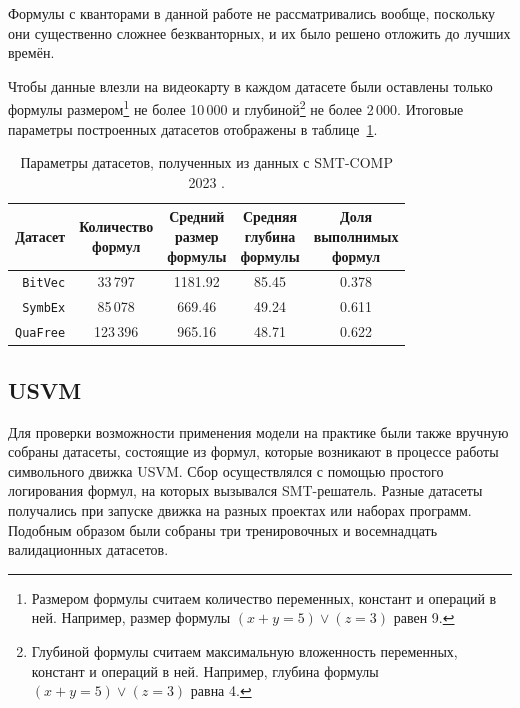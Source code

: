 Формулы с кванторами в данной работе не рассматривались вообще, поскольку они существенно сложнее безкванторных, и их было решено отложить до лучших времён.

Чтобы данные влезли на видеокарту в каждом датасете были оставлены только формулы размером\footnote{Размером формулы считаем количество переменных, констант и операций в ней. Например, размер формулы $(x + y = 5) \vee (z = 3)$ равен 9.} не более 10\,000 и глубиной\footnote{Глубиной формулы считаем максимальную вложенность переменных, констант и операций в ней. Например, глубина формулы $(x + y = 5) \vee (z = 3)$ равна 4.} не более 2\,000. Итоговые параметры построенных датасетов отображены в таблице~\ref{smt-comp-datasets-table}.

\begin{table}[ht]
\begin{center}
\begin{tabular}{r|cccc}
    Датасет & \makecell{Количество \\ формул} & \makecell{Средний \\ размер \\ формулы} & \makecell{Средняя \\ глубина \\ формулы} & \makecell{Доля \\ выполнимых \\ формул} \\
    \hline \hline
    \rule{0pt}{2.5ex}
    \texttt{BitVec} & 33\,797 & 1181.92 & 85.45 & 0.378 \\
    \texttt{SymbEx} & 85\,078 & 669.46 & 49.24 & 0.611 \\
    \texttt{QuaFree} & 123\,396 & 965.16 & 48.71 & 0.622 \\
\end{tabular}
\caption{\label{smt-comp-datasets-table} Параметры датасетов, полученных из данных с SMT-COMP 2023 \cite{smt-comp-2023-benchmarks}.}
\end{center}
\end{table}

\subsection{USVM}


Для проверки возможности применения модели на практике были также вручную собраны датасеты, состоящие из формул, которые возникают в процессе работы символьного движка USVM. Сбор осуществлялся с помощью простого логирования формул, на которых вызывался SMT-решатель. Разные датасеты получались при запуске движка на разных проектах или наборах программ. Подобным образом были собраны три тренировочных и восемнадцать валидационных датасетов.

